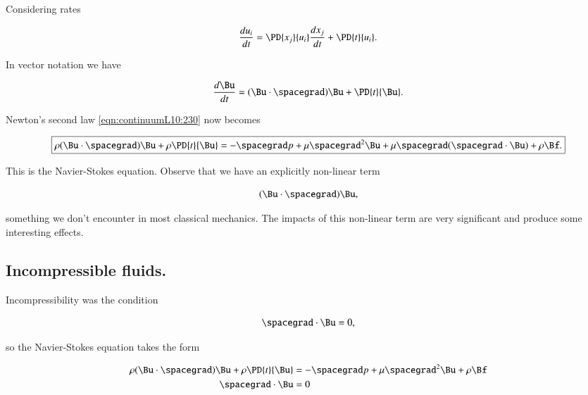 Considering rates

\begin{equation}\label{eqn:continuumL10:270}
\frac{du_i}{dt} = \PD{x_j}{u_i} \frac{dx_j}{dt} + \PD{t}{u_i} .
\end{equation}

In vector notation we have

\begin{equation}\label{eqn:continuumL10:290}
\frac{d\Bu}{dt} = (\Bu \cdot \spacegrad) \Bu + \PD{t}{\Bu}.
\end{equation}

Newton's second law \ref{eqn:continuumL10:230} now becomes

\begin{equation}\label{eqn:continuumL10:230b}
\boxed{
\rho 
 (\Bu \cdot \spacegrad) \Bu + \rho \PD{t}{\Bu} 
= -\spacegrad p + \mu \spacegrad^2 \Bu 
+ \mu \spacegrad (\spacegrad \cdot \Bu) + \rho \Bf.
}
\end{equation}

This is the Navier-Stokes equation.  Observe that we have an explicitly non-linear term

\begin{equation}\label{eqn:continuumL10:310}
(\Bu \cdot \spacegrad) \Bu ,
\end{equation}

something we don't encounter in most classical mechanics.  The impacts of this non-linear term are very significant and produce some interesting effects.

\subsection{Incompressible fluids.}

Incompressibility was the condition

\begin{equation}\label{eqn:continuumL10:330}
\spacegrad \cdot \Bu = 0,
\end{equation}

so the Navier-Stokes equation takes the form

\begin{equation}\label{eqn:continuumL10:230c}
\begin{aligned}
\rho 
 (\Bu \cdot \spacegrad) \Bu + \rho \PD{t}{\Bu} 
&= -\spacegrad p + \mu \spacegrad^2 \Bu 
+ \rho \Bf \\
\spacegrad \cdot \Bu &= 0
\end{aligned}
\end{equation}

